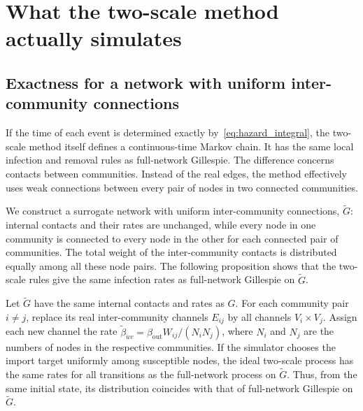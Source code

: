 \section{What the two-scale method actually simulates}
\label{sec:analysis}

\subsection{Exactness for a network with uniform inter-community connections}
\label{sec:surrogate}

If the time of each event is determined exactly by~\eqref{eq:hazard_integral}, the two-scale method itself defines a continuous-time Markov chain. It has the same local infection and removal rules as full-network Gillespie. The difference concerns contacts between communities. Instead of the real edges, the method effectively uses weak connections between every pair of nodes in two connected communities.

We construct a surrogate network with uniform inter-community connections, $\tilde G$: internal contacts and their rates are unchanged, while every node in one community is connected to every node in the other for each connected pair of communities. The total weight of the inter-community contacts is distributed equally among all these node pairs. The following proposition shows that the two-scale rules give the same infection rates as full-network Gillespie on $\tilde G$.

\begin{proposition}
\label{prop:surrogate}
Let $\tilde G$ have the same internal contacts and rates as $G$. For each community pair $i\neq j$, replace its real inter-community channels $E_{ij}$ by all channels $V_i\times V_j$. Assign each new channel the rate $\tilde\beta_{uv}=\beta_{\mathrm{out}}W_{ij}/(N_iN_j)$, where $N_i$ and $N_j$ are the numbers of nodes in the respective communities. If the simulator chooses the import target uniformly among susceptible nodes, the ideal two-scale process has the same rates for all transitions as the full-network process on $\tilde G$. Thus, from the same initial state, its distribution coincides with that of full-network Gillespie on $\tilde G$.
\end{proposition}

